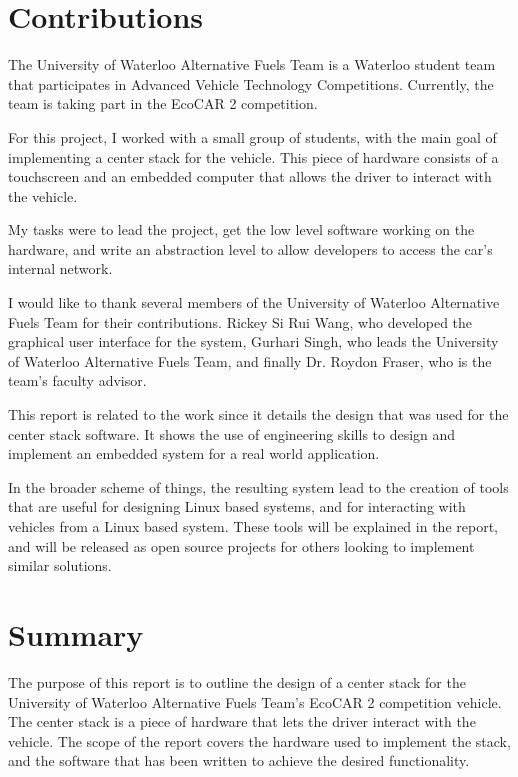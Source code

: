 \documentclass[ece]{uw-wkrpt}
\begin{document}
\begin{onehalfspacing}
\section{Contributions}

The University of Waterloo Alternative Fuels Team is a Waterloo student
team that participates in Advanced Vehicle Technology Competitions. Currently,
the team is taking part in the EcoCAR 2 competition.

For this project, I worked with a small group of students, with the main goal of 
implementing a center stack for the vehicle. This piece of hardware consists of a
touchscreen and an embedded computer that allows the driver to interact with the
vehicle.

My tasks were to lead the project, get the low level software working on the
hardware, and write an abstraction level to allow developers to access the car's
internal network.

I would like to thank several members of the University of Waterloo Alternative
Fuels Team for their contributions.
Rickey Si Rui Wang, who developed the graphical user interface for the system,
Gurhari Singh, who leads the University of Waterloo Alternative Fuels Team, and
finally Dr. Roydon Fraser, who is the team's faculty advisor.

This report is related to the work since it details the design that was used for
the center stack software. It shows the use of engineering skills to design and
implement an embedded system for a real world application.

In the broader scheme of things, the resulting system lead to the creation of
tools that are useful for designing Linux based systems, and for interacting
with vehicles from a Linux based system. These tools will be explained in the
report, and will be released as open source projects for others looking to
implement similar solutions.

\section{Summary}

The purpose of this report is to outline the design of a center stack
for the University of Waterloo Alternative Fuels Team's EcoCAR 2 competition
vehicle. The center stack is a piece of hardware that lets the driver interact
with the vehicle. The scope of the report covers the hardware used to implement the
stack, and the software that has been written to achieve the desired
functionality.


\end{onehalfspacing}
\end{document}
